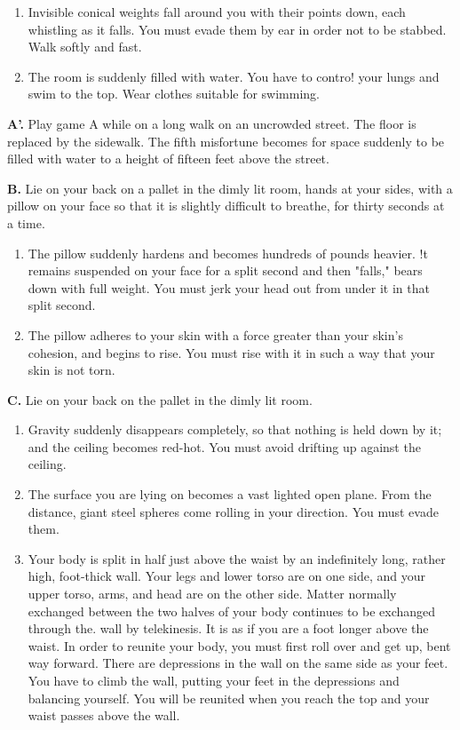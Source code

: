 \documentclass[10pt,twoside,draft]{memoir}
\begin{document}
{{\begin{enumerate}
\item Invisible conical weights fall around you with their points down, each 
whistling as it falls. You must evade them by ear in order not to be stabbed. 
Walk softly and fast. 

\item The room is suddenly filled with water. You have to contro! your lungs 
and swim to the top. Wear clothes suitable for swimming. 
\end{enumerate}

\textbf{A'.} Play game A while on a long walk on an uncrowded street. The floor 
is replaced by the sidewalk. The fifth misfortune becomes for space suddenly 
to be filled with water to a height of fifteen feet above the street. 

\textbf{B.} Lie on your back on a pallet in the dimly lit room, hands at your 
sides, with a pillow on your face so that it is slightly difficult to breathe, for 
thirty seconds at a time. 
\begin{enumerate}
\item The pillow suddenly hardens and becomes hundreds of pounds heavier. !t 
remains suspended on your face for a split second and then "falls," bears 
down with full weight. You must jerk your head out from under it in that 
split second. 

\item The pillow adheres to your skin with a force greater than your skin's 
cohesion, and begins to rise. You must rise with it in such a way that your 
skin is not torn. 
\end{enumerate}

\textbf{C.} Lie on your back on the pallet in the dimly lit room. 

\begin{enumerate}
\item Gravity suddenly disappears completely, so that nothing is held down by 
it; and the ceiling becomes red-hot. You must avoid drifting up against the 
ceiling. 

\item The surface you are lying on becomes a vast lighted open plane. From the 
distance, giant steel spheres come rolling in your direction. You must evade 
them. 

\item Your body is split in half just above the waist by an indefinitely long, 
rather high, foot-thick wall. Your legs and lower torso are on one side, and 
your upper torso, arms, and head are on the other side. Matter normally 
exchanged between the two halves of your body continues to be exchanged 
through the. wall by telekinesis. It is as if you are a foot longer above the 
waist. In order to reunite your body, you must first roll over and get up, 
bent way forward. There are depressions in the wall on the same side as your 
feet. You have to climb the wall, putting your feet in the depressions and 
balancing yourself. You will be reunited when you reach the top and your 
waist passes above the wall. 
\end{enumerate}

}}
\end{document}
